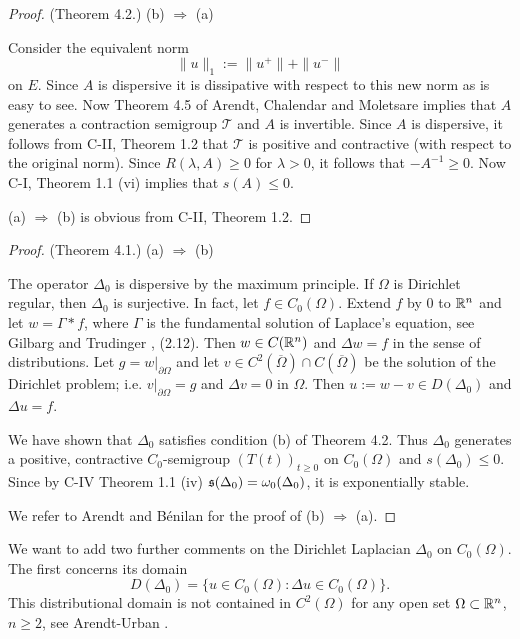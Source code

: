 \begin{proof}(Theorem 4.2.) 
(b) $\Rightarrow$ (a)

Consider the equivalent norm
\[
\|u\|_1 := \|u^+\| + \|u^-\|
\]
on $E$. 
Since $A$ is dispersive it is dissipative with respect to this new norm as is easy to see. Now Theorem 4.5 of Arendt, Chalendar and Moletsare \cite{ACM24} implies that $A$ generates a contraction semigroup $\mathcal{T}$ and $A$ is invertible. Since $A$ is dispersive, it follows from C-II, Theorem 1.2 that $\mathcal{T}$ is positive and contractive (with respect to the original norm). Since $R(\lambda, A) \geq 0$ for $\lambda > 0$, it follows that $-A^{-1} \geq 0$. Now C-I, Theorem 1.1 (vi) implies that $s(A) \leq 0$.

(a) $\Rightarrow$ (b) is obvious from C-II, Theorem 1.2. 

\end{proof}
\begin{proof}(Theorem 4.1.)  
(a) $\Rightarrow$ (b)

The operator $\Delta_0$ is dispersive by the maximum principle. 
If $\Omega$ is Dirichlet regular, then $\Delta_0$ is surjective. In fact, let $f \in C_0(\Omega)$. Extend $f$ by $0$ to $\mathbb{R}^n$ and let $w = \Gamma * f$, where $\Gamma$ is the fundamental solution of Laplace's equation, see Gilbarg and Trudinger \cite{GT83}, (2.12). Then $w \in C(\mathbb{R}^n)$ and $\Delta w = f$ in the sense of distributions. Let $g = w|_{\partial\Omega}$ and let $v \in C^2(\overline{\Omega}) \cap C(\overline{\Omega})$ be the solution of the Dirichlet problem; i.e. $v|_{\partial\Omega} = g$ and $\Delta v = 0$ in $\Omega$. Then $u := w - v \in D(\Delta_0)$ and $\Delta u = f$.

We have shown that $\Delta_0$ satisfies condition (b) of Theorem 4.2. Thus $\Delta_0$ generates a positive, contractive $C_0$-semigroup $(T(t))_{t \geq 0}$ on $C_0(\Omega)$ and $s(\Delta_0) \leq 0$. Since by C-IV Theorem 1.1 (iv) $\mathfrak{s}(\Delta_0) = \omega_0(\Delta_0)$, it is exponentially stable.

We refer to Arendt and Bénilan \cite{ArBe99} for the proof of (b) $\Rightarrow$ (a).

\end{proof}
We want to add two further comments on the Dirichlet Laplacian $\Delta_0$ on $C_0(\Omega)$. The first concerns its domain
\[
D(\Delta_0) = \{u \in C_0(\Omega) \colon \Delta u \in C_0(\Omega)\}.
\]
This distributional domain is not contained in $C^2(\Omega)$ for any open set $\Omega \subset \mathbb{R}^n$, $n \geq 2$, see Arendt-Urban \cite[Theorem 6.60]{Au23}. 

